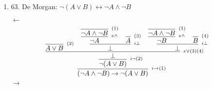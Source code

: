 \documentclass[]{article}
\def\imp{\to} %
\def\ifof{\leftrightarrow} %
\def\n{\neg}%
\begin{document}
\begin{enumerate}
	\item 63. De Morgan: $\n(A\lor B) \ifof \n A \land \n B$
	
	$\gets$
	$$
	\infer[^{i \imp (1)}]{(\n A  \land \n B) \imp \n (A \lor B)}{
	  \infer[^{i \n (2)}]{\n (A \lor B)}{
	    \infer[^{e \lor (3)(4)}]{\bot}{
	    \infer[^{(2)}]{A\lor B}{}
	    &
	    \infer[^{i \bot}]{\bot}{
	      \infer[^{e \land}]{\neg A}{\infer[^{(1)}]{\neg A \land \n B}{}}
	      &
	      \infer[^{(3)}]{A}{}	
	    }
    	&
    	\infer[^{i \bot}]{\bot}{
    		\infer[^{e \land}]{\neg B}{\infer[^{(1)}]{\neg A \land \n B}{}}
    		&
    		\infer[^{(4)}]{B}{}	
    	}	
	    }	
	  }
	}
	$$
	$\imp$
	$$
	
	$$
\end{enumerate}
\end{document}
